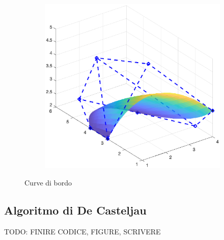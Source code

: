 \documentclass[a4paper, 10pt]{article}
\begin{document}
\begin{figure}[]
\begin{subfigure}[b]{0.3\textwidth}
      \label{fig:border_curve_no_surf}
  \end{subfigure}
  \begin{subfigure}[b]{0.3\textwidth}
      \includegraphics[width=\textwidth]{figure/surf_no_bord.eps}
      \label{fig:surf_no_bord}
  \end{subfigure}
  \caption{Curve di bordo}\label{fig:bezier_border_curve}
\end{figure}

\subsection{Algoritmo di De Casteljau}
TODO: FINIRE CODICE, FIGURE, SCRIVERE
\end{document}
